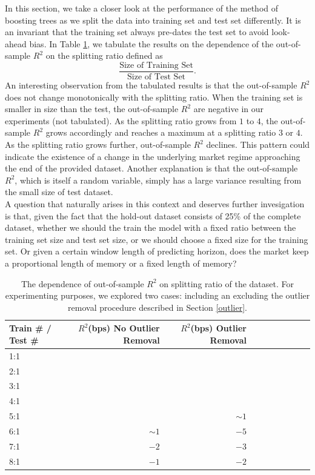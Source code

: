 \documentclass[
11pt, %
a4paper, %
oneside, %
headinclude,footinclude, %
BCOR5mm, %
]{scrartcl}
\begin{document}
In this section, we take a closer look at the performance of the method of boosting trees as we split the data into training set and test set differently. It is an invariant that the training set always pre-dates the test set to avoid look-ahead bias. In Table \ref{split}, we tabulate the results on the dependence of the out-of-sample $R^2$ on the splitting ratio defined as
$$
\frac{\text{Size of Training Set}}{\text{Size of Test Set}}.
$$
An interesting observation from the tabulated results is that the out-of-sample $R^2$ does not change monotonically with the splitting ratio. When the training set is smaller in size than the test, the out-of-sample $R^2$ are negative in our experiments (not tabulated). As the splitting ratio grows from $1$ to $4$, the out-of-sample $R^2$ grows accordingly and reaches a maximum at a splitting ratio $3$ or $4$. As the splitting ratio grows further, out-of-sample $R^2$ declines. This  pattern could indicate the existence of a change in the underlying market regime approaching the end of the provided dataset. Another explanation is that the out-of-sample $R^2$, which is itself a random variable, simply has a large variance resulting from the small size of test dataset. \\
\newline
A question that naturally arises in this context and deserves further invesigation is that, given the fact that the hold-out dataset consists of 25\% of the complete dataset, whether we should the train the model with a fixed ratio between the training set size and test set size, or we should choose a fixed size for the training set. Or given a certain window length of predicting horizon, does the market keep a proportional length of memory or a fixed length of memory? 

\begin{table}[ht!]
\center
\small
	\begin{tabular}{lrrrrrrrrr}  
		\toprule
		Train \# / Test \# & $R^2$(bps) No Outlier Removal &  $R^2$(bps) Outlier Removal \\
		\midrule
	    1:1 & \color{red}{$+3$}	& \color{red}{$+4$}	 \\
	    2:1 & \color{red}{$+4$}	& \color{red}{$+5$}	 \\
	    3:1 & \color{red}{$+15$}	& \color{red}{$+13$}	 \\
	    4:1 & \color{red}{$+15$}	& \color{red}{$+13$}	 \\
	    5:1 & \color{red}{$+7$}	& $\sim 1$	 \\
	    6:1 & $\sim 1$	& $-5$	 \\
	    7:1 & $-2$	& $-3$	 \\
	    8:1 & $-1$	& $-2$	 \\
		\bottomrule
	\end{tabular}
	\caption{The dependence of out-of-sample $R^2$ on splitting ratio of the dataset. For experimenting purposes, we explored two cases: including an excluding the outlier removal procedure described in Section \ref{outlier}. }\label{split}
\end{table}
\end{document}
